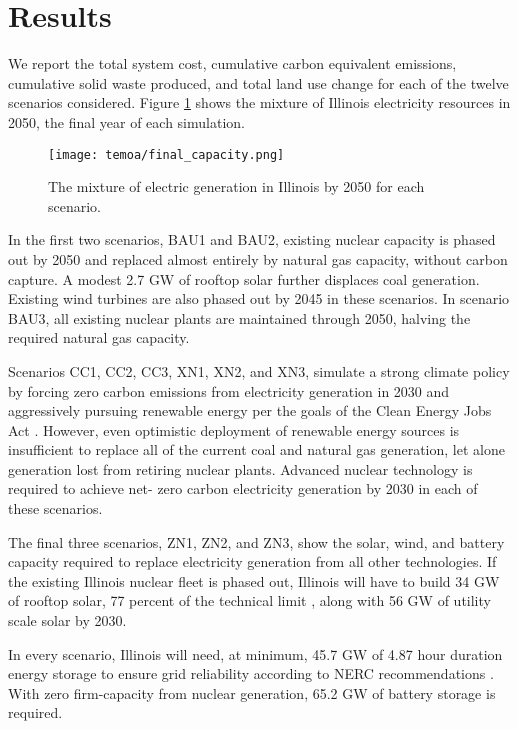 \section{Results}\label{sec:results}

We report the total system cost, cumulative carbon equivalent emissions,
cumulative solid waste produced, and total land use change for each of the
twelve scenarios considered. Figure \ref{fig:cap-2050} shows the mixture of
Illinois electricity resources in 2050, the final year of each simulation.

\begin{figure}[H]
  \centering
  \texttt{[image: temoa/final\_capacity.png]}
  \caption{The mixture of electric generation in Illinois by 2050 for each scenario.}
  \label{fig:cap-2050}
\end{figure}

In the first two scenarios, BAU1 and BAU2, existing nuclear capacity is phased out
by 2050 and replaced almost entirely by natural gas capacity, without carbon
capture. A modest 2.7 GW of rooftop solar further displaces coal generation.
Existing wind turbines are also phased out by 2045 in these scenarios. In
scenario BAU3, all existing nuclear plants are maintained through 2050, halving
the required natural gas capacity.

Scenarios CC1, CC2, CC3, XN1, XN2, and XN3, simulate a strong climate policy by
forcing zero carbon emissions from electricity generation in 2030 and
aggressively pursuing renewable energy per the goals of the Clean Energy Jobs
Act \cite{illinois_clean_jobs_coalition_clean_2021}. However, even optimistic
deployment of renewable energy sources is insufficient to replace all of the
current coal and natural gas generation, let alone generation lost from
retiring nuclear plants. Advanced nuclear technology is required to achieve net-
zero carbon electricity generation by 2030 in each of these scenarios.

The final three scenarios, ZN1, ZN2, and ZN3, show the solar, wind, and battery
capacity required to replace electricity generation from all other technologies.
If the existing Illinois nuclear fleet is phased out, Illinois will have to
build 34 GW of rooftop solar, 77 percent of the technical limit \cite{gagnon_rooftop_2016}, along with 56 GW of utility scale solar by 2030.

In every scenario, Illinois will need, at minimum, 45.7 GW of 4.87 hour duration
energy storage to ensure grid reliability according to NERC recommendations
\cite{milligan_methods_2011}. With zero firm-capacity from nuclear
generation, 65.2 GW of battery storage is required.

